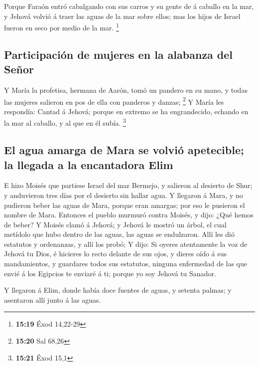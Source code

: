  Porque Faraón entró cabalgando con sus carros y su gente
de á caballo en la mar, y Jehová volvió á traer las aguas de la mar
sobre ellos; mas los hijos de Israel fueron en seco por medio de la mar.
\footnote{\textbf{15:19} Éxod 14,22-29}

\hypertarget{participaciuxf3n-de-mujeres-en-la-alabanza-del-seuxf1or}{%
\subsection{Participación de mujeres en la alabanza del
Señor}\label{participaciuxf3n-de-mujeres-en-la-alabanza-del-seuxf1or}}

 Y María la profetisa, hermana de Aarón, tomó un pandero
en su mano, y todas las mujeres salieron en pos de ella con panderos y
danzas; \footnote{\textbf{15:20} Sal 68,26}  Y María les
respondía: Cantad á Jehová; porque en extremo se ha engrandecido,
echando en la mar al caballo, y al que en él subía. \footnote{\textbf{15:21}
  Éxod 15,1}

\hypertarget{el-agua-amarga-de-mara-se-volviuxf3-apetecible-la-llegada-a-la-encantadora-elim}{%
\subsection{El agua amarga de Mara se volvió apetecible; la llegada a la
encantadora
Elim}\label{el-agua-amarga-de-mara-se-volviuxf3-apetecible-la-llegada-a-la-encantadora-elim}}

 E hizo Moisés que partiese Israel del mar Bermejo, y
salieron al desierto de Shur; y anduvieron tres días por el desierto sin
hallar agua.  Y llegaron á Mara, y no pudieron beber las
aguas de Mara, porque eran amargas; por eso le pusieron el nombre de
Mara.  Entonces el pueblo murmuró contra Moisés, y dijo:
¿Qué hemos de beber?  Y Moisés clamó á Jehová; y Jehová
le mostró un árbol, el cual metídolo que hubo dentro de las aguas, las
aguas se endulzaron. Allí les dió estatutos y ordenanzas, y allí los
probó;  Y dijo: Si oyeres atentamente la voz de Jehová tu
Dios, é hicieres lo recto delante de sus ojos, y dieres oído á sus
mandamientos, y guardares todos sus estatutos, ninguna enfermedad de las
que envié á los Egipcios te enviaré á ti; porque yo soy Jehová tu
Sanador.

 Y llegaron á Elim, donde había doce fuentes de aguas, y
setenta palmas; y asentaron allí junto á las aguas.

